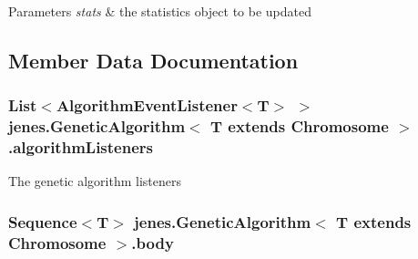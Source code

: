 \begin{DoxyParams}{Parameters}
{\em stats} & the statistics object to be updated \\
\hline
\end{DoxyParams}


\subsection{Member Data Documentation}
\hypertarget{classjenes_1_1_genetic_algorithm_3_01_t_01extends_01_chromosome_01_4_a53540867ddd13889614232b3cbea6d6f}{
\subsubsection[{algorithm\-Listeners}]{\setlength{\rightskip}{0pt plus 5cm}List$<$Algorithm\-Event\-Listener$<$T$>$ $>$ jenes.\-Genetic\-Algorithm$<$ T extends Chromosome $>$.algorithm\-Listeners\hspace{0.3cm}{\ttfamily [protected]}}}\label{classjenes_1_1_genetic_algorithm_3_01_t_01extends_01_chromosome_01_4_a53540867ddd13889614232b3cbea6d6f}
The genetic algorithm listeners \hypertarget{classjenes_1_1_genetic_algorithm_3_01_t_01extends_01_chromosome_01_4_a0040f9dbb0018e8bb28dde97dacac7d8}{
\subsubsection[{body}]{\setlength{\rightskip}{0pt plus 5cm}Sequence$<$T$>$ jenes.\-Genetic\-Algorithm$<$ T extends Chromosome $>$.body\hspace{0.3cm}{\ttfamily [protected]}}}\label{classjenes_1_1_genetic_algorithm_3_01_t_01extends_01_chromosome_01_4_a0040f9dbb0018e8bb28dde97dacac7d8}
